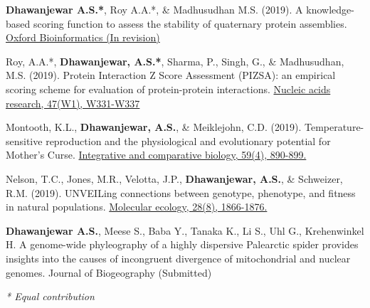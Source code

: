 


\begin{cvpubs}

  \pubentry
    {\textbf{Dhawanjewar A.S.*}, Roy A.A.*, \& Madhusudhan M.S. (2019).}
	{A knowledge-based scoring function to assess the stability of quaternary protein assemblies.}
	{\href{https://doi.org/10.1101/562520}{Oxford Bioinformatics (In revision)}} 
	
  \pubentry
     {Roy, A.A.*, \textbf{Dhawanjewar, A.S.*}, Sharma, P., Singh, G., \& Madhusudhan, M.S. (2019).}
  	{Protein Interaction Z Score Assessment (PIZSA): an empirical scoring scheme for evaluation of protein-protein interactions.} 
	{\href{https://doi.org/10.1093/nar/gkz368}{Nucleic acids research, 47(W1), W331-W337}}

  \pubentry
    {Montooth, K.L., \textbf{Dhawanjewar, A.S.}, \& Meiklejohn, C.D. (2019).}
	{Temperature-sensitive reproduction and the physiological and evolutionary potential for Mother's Curse.}	{\href{https://doi.org/10.1093/icb/icz091}{Integrative and comparative biology, 59(4), 890-899.}}

  \pubentry
    {Nelson, T.C., Jones, M.R., Velotta, J.P., \textbf{Dhawanjewar, A.S.}, \& Schweizer, R.M. (2019).}
	{UNVEILing connections between genotype, phenotype, and fitness in natural populations.}
	{\href{https://doi.org/10.1111/mec.15067}{Molecular ecology, 28(8), 1866-1876.}}
	
  \pubentry
  	{\textbf{Dhawanjewar A.S.}, Meese S., Baba Y., Tanaka K., Li S., Uhl G., Krehenwinkel H.}
  	{A genome-wide phyleography of a highly dispersive Palearctic spider provides insights into the causes of incongruent divergence of mitochondrial and nuclear genomes.}
  	{Journal of Biogeography (Submitted)}
	
	\fontsize{10pt}{1em}\bodyfontlight\itshape\color{graytext} * Equal contribution

\end{cvpubs}
